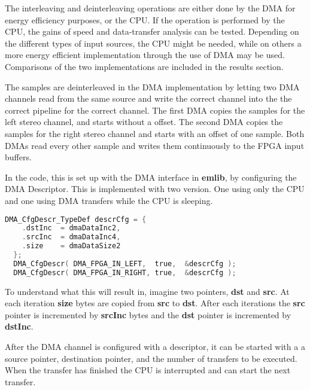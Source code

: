 
The interleaving and deinterleaving operations are either done by the DMA for
energy efficiency purposes, or the CPU. If the operation is performed by the
CPU, the gains of speed and data-transfer analysis can be tested. Depending on
the different types of input sources, the CPU might be needed, while on others a
more energy efficient implementation through the use of DMA may be used.
Comparisons of the two implementations are included in the results section.

The samples are deinterleaved in the DMA implementation by letting two DMA
channels read from the same source and write the correct channel into the the
correct pipeline for the correct channel. The first DMA copies the samples for
the left stereo channel, and starts without a offset. The second DMA copies the
samples for the right stereo channel and starts with an offset of one sample.
Both DMAs read every other sample and writes them continuously to the FPGA input
buffers.

In the code, this is set up with the DMA interface in {\bf emlib}, by
configuring the DMA Descriptor.  This is implemented with two
version. One using only the CPU and one using DMA transfers while the CPU is
sleeping.

\begin{lstlisting}[language=C, label=mcu:datapah1, caption=DMA Configuration Descriptor initialization]
  DMA_CfgDescr_TypeDef descrCfg = {
    .dstInc  = dmaDataInc2,
    .srcInc  = dmaDataInc4,
    .size    = dmaDataSize2
  };
  DMA_CfgDescr( DMA_FPGA_IN_LEFT,  true,  &descrCfg );
  DMA_CfgDescr( DMA_FPGA_IN_RIGHT, true,  &descrCfg );
\end{lstlisting}


To understand what this will result in, imagine two pointers, {\bf dst} and {\bf
src}. At each iteration {\bf size} bytes are copied from {\bf src} to {\bf dst}.
After each iterations the {\bf src} pointer is incremented by {\bf srcInc} bytes
and the {\bf dst} pointer is incremented by {\bf dstInc}.

After the DMA channel is configured with a descriptor, it can be started with a
a source pointer, destination pointer, and the number of transfers to be
executed. When the transfer has finished the CPU is interrupted and can start
the next transfer.

